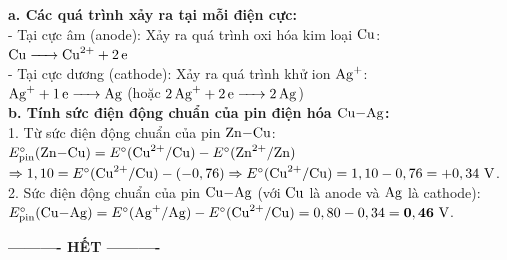 \documentclass[11pt,a4paper]{article}
\begin{document}
\begin{tcolorbox}[colback=tableGreen!30,colframe=mainGreen!70,title=\textbf{Hướng dẫn giải chi tiết Câu 3},fonttitle=\bfseries]
\textbf{a. Các quá trình xảy ra tại mỗi điện cực:}\\
- Tại cực âm (anode): Xảy ra quá trình oxi hóa kim loại $\ce{Cu}$:\\
$\ce{Cu -> Cu^2+ + 2e}$\\
- Tại cực dương (cathode): Xảy ra quá trình khử ion $\ce{Ag+}$:\\
$\ce{Ag+ + 1e -> Ag}$ \quad(hoặc $\ce{2Ag+ + 2e -> 2Ag}$)\\[4pt]
\textbf{b. Tính sức điện động chuẩn của pin điện hóa $\ce{Cu-Ag}$:}\\
1. Từ sức điện động chuẩn của pin $\ce{Zn-Cu}$:\\
$E^\circ_{\text{pin}}(\ce{Zn-Cu}) = E^\circ(\ce{Cu^2+/Cu}) - E^\circ(\ce{Zn^2+/Zn})$\\
$\Rightarrow 1,10 = E^\circ(\ce{Cu^2+/Cu}) - (-0,76) \Rightarrow E^\circ(\ce{Cu^2+/Cu}) = 1,10 - 0,76 = +0,34\text{ V}$.\\
2. Sức điện động chuẩn của pin $\ce{Cu-Ag}$ (với $\ce{Cu}$ là anode và $\ce{Ag}$ là cathode):\\
$E^\circ_{\text{pin}}(\ce{Cu-Ag}) = E^\circ(\ce{Ag+/Ag}) - E^\circ(\ce{Cu^2+/Cu}) = 0,80 - 0,34 = \mathbf{0,46\text{ V}}$.
\end{tcolorbox}

\vspace{8pt}
\begin{center}
\textbf{---------- HẾT ----------}
\end{center}
\end{document}
